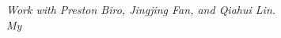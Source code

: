 \documentclass[11pt,letter]{article}
\begin{document}
\maketitle

\newpage


\emph{\noindent Work with Preston Biro, Jingjing Fan, and Qiahui Lin. \\My }










% 


% 





% 
\pagebreak





% 
 

\nocite{peel2010impact}



\begin{raggedright}

\end{raggedright}


\end{document}
